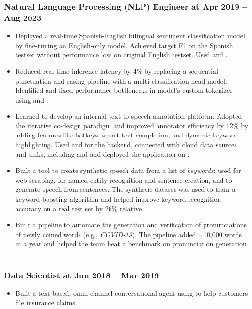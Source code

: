 \documentclass{ExpressiveResume}
\newcommand{\mainBullet}{\hspace{12pt}\color{blue}\fontsize{11}{13.2}\selectfont{\ding{70}}}
\begin{document}
\subsubsection*{\mainBullet Natural Language Processing (NLP) Engineer at  \hfill Apr 2019 -- Aug 2023}
\begin{itemize}[leftmargin=*, label={}]
    \item Deployed a real-time Spanish-English bilingual sentiment classification model by fine-tuning an English-only model. Achieved target F1 on the Spanish testset without performance loss on original English testset. Used  and .
    \item Reduced real-time inference latency by 4\% by replacing a sequential punctuation and casing pipeline with a multi-classification-head  model. Identified and fixed performance bottlenecks in model's custom tokenizer using  and .
    \item Learned  to develop an internal text-to-speech annotation platform. Adopted the iterative co-design paradigm and improved annotator efficiency by 12\% by adding features like hotkeys, smart text completion, and dynamic keyword highlighting.
    Used  and  for the backend, connected with cloud data sources and sinks, including  and  and deployed the application on .
    \item Built a tool to create synthetic speech data from a list of \emph{keywords}: used  for web scraping,  for named entity recognition and sentence creation, and  to generate speech from sentences. The synthetic dataset was used to train a keyword boosting algorithm \cite{li2023ngramboostingimprovingcontextual} and helped improve keyword recognition accuracy on a real test set by 26\% relative.
    \item Built a  pipeline to automate the generation and verification of pronunciations of newly coined words (e.g., \emph{COVID-19}). The pipeline added $\sim$10,000 words in a year and helped the team beat a benchmark on pronunciation generation \cite{gautam-etal-2021-avengers}.
\end{itemize}

\subsubsection*{\mainBullet Data Scientist at  \hfill Jun 2018 -- Mar 2019}
\begin{itemize}[leftmargin=*, label={}]
    \item Built a text-based, omni-channel conversational agent using  to help customers file insurance claims.
\end{itemize}
\end{document}
